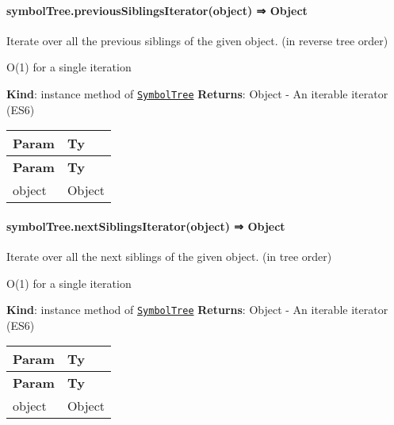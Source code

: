 \label{_module_symbol-tree--SymbolTree+previousSiblingsIterator}%


\paragraph*{symbol\+Tree.\+previous\+Siblings\+Iterator(object) ⇒ {\ttfamily Object}}

Iterate over all the previous siblings of the given object. (in reverse tree order)


\begin{DoxyItemize}
\item {\ttfamily O(1)} for a single iteration
\end{DoxyItemize}

{\bfseries Kind}\+: instance method of {\ttfamily \href{#exp_module_symbol-tree--SymbolTree}{\tt Symbol\+Tree}} {\bfseries Returns}\+: {\ttfamily Object} -\/ An iterable iterator (E\+S6)

\tabulinesep=1mm
\begin{longtabu} spread 0pt [c]{*{2}{|X[-1]}|}
\hline
\rowcolor{\tableheadbgcolor}\textbf{ Param  }&\textbf{ Ty   }\\
\endfirsthead
\hline
\endfoot
\hline
\rowcolor{\tableheadbgcolor}\textbf{ Param  }&\textbf{ Ty   }\\
\endhead
object  &{\ttfamily Object}   \\
\end{longtabu}


\label{_module_symbol-tree--SymbolTree+nextSiblingsIterator}%


\paragraph*{symbol\+Tree.\+next\+Siblings\+Iterator(object) ⇒ {\ttfamily Object}}

Iterate over all the next siblings of the given object. (in tree order)


\begin{DoxyItemize}
\item {\ttfamily O(1)} for a single iteration
\end{DoxyItemize}

{\bfseries Kind}\+: instance method of {\ttfamily \href{#exp_module_symbol-tree--SymbolTree}{\tt Symbol\+Tree}} {\bfseries Returns}\+: {\ttfamily Object} -\/ An iterable iterator (E\+S6)

\tabulinesep=1mm
\begin{longtabu} spread 0pt [c]{*{2}{|X[-1]}|}
\hline
\rowcolor{\tableheadbgcolor}\textbf{ Param  }&\textbf{ Ty   }\\
\endfirsthead
\hline
\endfoot
\hline
\rowcolor{\tableheadbgcolor}\textbf{ Param  }&\textbf{ Ty   }\\
\endhead
object  &{\ttfamily Object}   \\
\end{longtabu}


